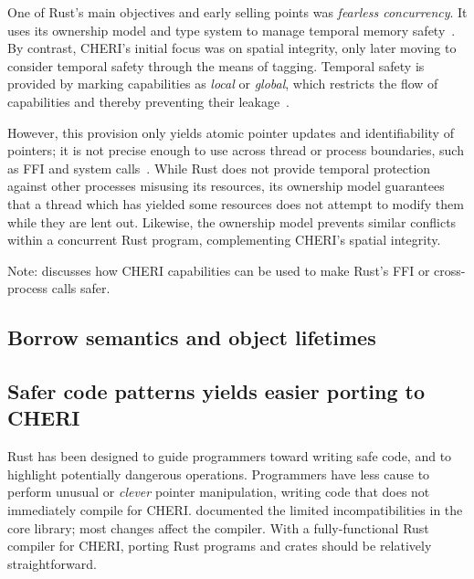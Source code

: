 \documentclass[dissertation.tex]{subfiles}
\begin{document}

One of Rust's main objectives and early selling points was
\emph{fearless concurrency}.
It uses its ownership model and type system to manage temporal memory
safety~\cite{rust-trpl-book}.
By contrast, CHERI's initial focus was on spatial integrity, only later
moving to consider temporal safety through the means of tagging.
Temporal safety is provided by marking capabilities as \emph{local} or
\emph{global}, which restricts the flow of capabilities and thereby
preventing their leakage~\cite{cheri2015}.

However, this provision only yields atomic pointer updates and
identifiability of pointers;
it is not precise enough to use across thread or process boundaries,
such as FFI and system calls~\cite{cheri-2019-abstract}.
While Rust does not provide temporal protection against other processes
misusing its resources, its ownership model guarantees that a thread
which has yielded some resources does not attempt to modify them while
they are lent out.
Likewise, the ownership model prevents similar conflicts within a
concurrent Rust program, complementing CHERI's spatial integrity.

Note:  discusses how CHERI capabilities can
be used to make Rust's FFI or cross-process calls safer.


\subsection{Borrow semantics and object lifetimes}


\subsection{Safer code patterns yields easier porting to CHERI}
\label{sec:eval-cheri-port}

Rust has been designed to guide programmers toward writing safe code,
and to highlight potentially dangerous operations.
Programmers have less cause to perform unusual or \emph{clever} pointer
manipulation, writing code that does not immediately compile for CHERI.
 documented the limited incompatibilities in the core
library; most changes affect the compiler.
With a fully-functional Rust compiler for CHERI, porting Rust programs
and crates should be relatively straightforward.
\end{document}
